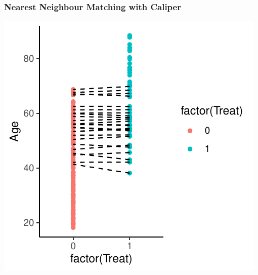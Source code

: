 \documentclass[xcolor=x11names,compress]{beamer}\usepackage[]{graphicx}\usepackage[]{color}
\makeatletter
\def\maxwidth{ %
  \ifdim\Gin@nat@width>\linewidth
    \linewidth
  \else
    \Gin@nat@width
  \fi
}
\newenvironment{knitrout}{}{} %
\renewcommand{\(}{\begin{columns}}
\renewcommand{\)}{\end{columns}}
\newcommand{\<}[1]{\begin{column}{#1}}
\renewcommand{\>}{\end{column}}
\makeatother
\begin{document}
\begin{frame}
\frametitle{Nearest Neighbour Matching with Caliper}
\begin{center}
\begin{knitrout}
\color{fgcolor}
\includegraphics[width=\maxwidth]{figure/nearest_matching_2_caliper-1} 

\end{knitrout}
\end{center}
\end{frame}
\end{document}
